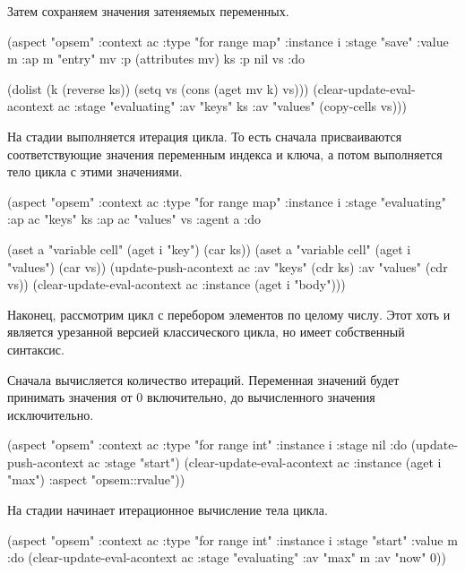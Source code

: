 \documentclass[12pt,twoside,russian]{article}
\newcommand{\textABMLString}[1]{{\color{abmlString}#1}}
\newcommand{\ABMLString}[1]{\abmlinline{\textABMLString{#1}}}
\begin{document}
Затем сохраняем значения затеняемых переменных.

\begin{ABMLCode}
(aspect "opsem" :context ac :type "for range map" :instance i 
  :stage "save" :value m :ap m "entry" mv 
  :p (attributes mv) ks :p nil vs :do 
  
  (dolist (k (reverse ks)) (setq vs (cons (aget mv k) vs))) 
  (clear-update-eval-acontext ac :stage "evaluating" :av "keys" ks 
    :av "values" (copy-cells vs)))
\end{ABMLCode}

На стадии \ABMLString{evaluating} выполняется итерация цикла. То есть сначала присваиваются соответствующие значения переменным индекса и ключа, а потом выполняется тело цикла с этими значениями.

\begin{ABMLCode}
(aspect "opsem" :context ac :type "for range map" :instance i 
  :stage "evaluating" :ap ac "keys" ks :ap ac "values" vs :agent a :do 
  
  (aset a "variable cell" (aget i "key") (car ks))
  (aset a "variable cell" (aget i "values") (car vs))
  (update-push-acontext ac :av "keys" (cdr ks) :av "values" (cdr vs))
  (clear-update-eval-acontext ac :instance (aget i "body")))
\end{ABMLCode}

Наконец, рассмотрим цикл с перебором элементов по целому числу. Этот хоть и является урезанной версией классического цикла, но имеет собственный синтаксис. 

Сначала вычисляется количество итераций. Переменная значений будет принимать значения от 0 включительно, до вычисленного значения исключительно.

\begin{ABMLCode}
(aspect "opsem" :context ac :type "for range int" :instance i 
  :stage nil :do 
  (update-push-acontext ac :stage "start")
  (clear-update-eval-acontext ac :instance (aget i "max") 
                                 :aspect "opsem::rvalue"))
\end{ABMLCode}

На стадии \ABMLString{start} начинает итерационное вычисление тела цикла.

\begin{ABMLCode}
(aspect "opsem" :context ac :type "for range int" :instance i 
  :stage "start" :value m :do 
  (clear-update-eval-acontext ac :stage "evaluating" :av "max" m 
    :av "now" 0))
\end{ABMLCode}
\end{document}
